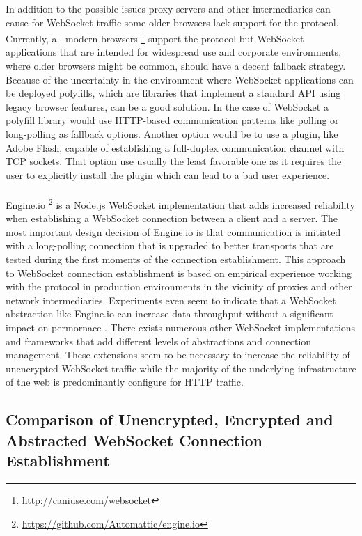 In addition to the possible issues proxy servers and other intermediaries can cause for WebSocket traffic some older browsers lack support for the protocol. Currently, all modern browsers \footnote{\url{http://caniuse.com/websocket}} support the protocol but WebSocket applications that are intended for widespread use and corporate environments, where older browsers might be common, should have a decent fallback strategy. Because of the uncertainty in the environment where WebSocket applications can be deployed polyfills, which are libraries that implement a standard API using legacy browser features, can be a good solution. In the case of WebSocket a polyfill library would use HTTP-based communication patterns like polling or long-polling as fallback options. Another option would be to use a plugin, like Adobe Flash, capable of establishing a full-duplex communication channel with TCP sockets. That option use usually the least favorable one as it requires the user to explicitly install the plugin which can lead to a bad user experience.
\\ \\
Engine.io \footnote{\url{https://github.com/Automattic/engine.io}} is a Node.js WebSocket implementation that adds increased reliability when establishing a WebSocket connection between a client and a server. The most important design decision of Engine.io is that communication is initiated with a long-polling connection that is upgraded to better transports that are tested during the first moments of the connection establishment. This approach to WebSocket connection establishment is based on empirical experience working with the protocol in production environments in the vicinity of proxies and other network intermediaries. Experiments even seem to indicate that a WebSocket abstraction like Engine.io can increase data throughput without a significant impact on permornace \cite{ozger2014websocket}. There exists numerous other WebSocket implementations and frameworks that add different levels of abstractions and connection management. These extensions seem to be necessary to increase the reliability of unencrypted WebSocket traffic while the majority of the underlying infrastructure of the web is predominantly configure for HTTP traffic.

\subsection{Comparison of Unencrypted, Encrypted and Abstracted WebSocket Connection Establishment}